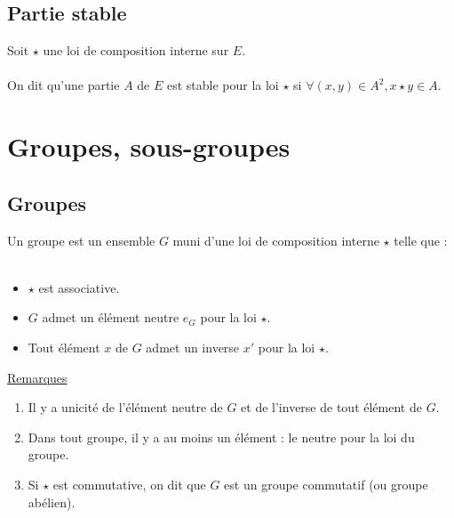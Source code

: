 \subsection{Partie stable}
\begin{defprop}
    Soit \(\star\) une loi de composition interne sur \(E\).\\~\\
    On dit qu’une partie \(A\) de \(E\) est stable pour la loi \(\star\) si \(\forall (x, y) \in A^2, x \star y \in A\).
\end{defprop}

\section{Groupes, sous-groupes}
\subsection{Groupes}
\begin{defi}
    Un groupe est un ensemble \(G\) muni d’une loi de composition interne \(\star\) telle que :\\~\\
    \begin{itemize}
        \item \(\star\) est associative.
        \item \(G\) admet un élément neutre \(e_G\) pour la loi \(\star\).
        \item Tout élément \(x\) de \(G\) admet un inverse \(x'\) pour la loi \(\star\).
    \end{itemize}
    \underline{Remarques}\\
    \begin{enumerate}
        \item Il y a unicité de l’élément neutre de \(G\) et de l’inverse de tout élément de \(G\).
        \item Dans tout groupe, il y a au moins un élément : le neutre pour la loi du groupe.
        \item Si \(\star\) est commutative, on dit que \(G\) est un groupe commutatif (ou groupe abélien).
    \end{enumerate}
\end{defi}

